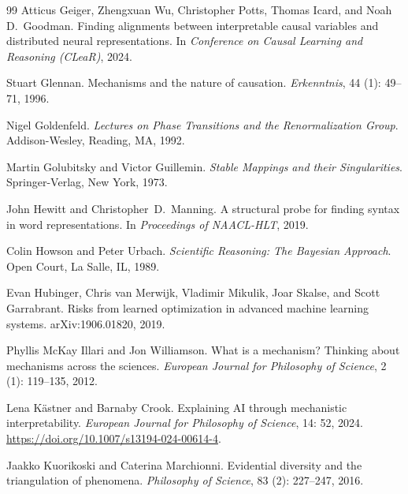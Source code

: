 \documentclass{article}
\begin{document}
\begin{thebibliography}{99}
Atticus Geiger, Zhengxuan Wu, Christopher Potts, Thomas Icard, and Noah D.\
  Goodman.
\newblock Finding alignments between interpretable causal variables and
  distributed neural representations.
\newblock In \emph{Conference on Causal Learning and Reasoning (CLeaR)}, 2024.

Stuart Glennan.
\newblock Mechanisms and the nature of causation.
\newblock \emph{Erkenntnis}, 44 (1): 49--71, 1996.

Nigel Goldenfeld.
\newblock \emph{Lectures on Phase Transitions and the Renormalization Group}.
\newblock Addison-Wesley, Reading, MA, 1992.

Martin Golubitsky and Victor Guillemin.
\newblock \emph{Stable Mappings and their Singularities}.
\newblock Springer-Verlag, New York, 1973.

John Hewitt and Christopher~D.\ Manning.
\newblock A structural probe for finding syntax in word representations.
\newblock In \emph{Proceedings of NAACL-HLT}, 2019.

Colin Howson and Peter Urbach.
\newblock \emph{Scientific Reasoning: The Bayesian Approach}.
\newblock Open Court, La Salle, IL, 1989.

Evan Hubinger, Chris van Merwijk, Vladimir Mikulik, Joar Skalse, and
  Scott Garrabrant.
\newblock Risks from learned optimization in advanced machine learning systems.
\newblock arXiv:1906.01820, 2019.

Phyllis McKay Illari and Jon Williamson.
\newblock What is a mechanism? Thinking about mechanisms across the sciences.
\newblock \emph{European Journal for Philosophy of Science},
  2 (1):\penalty0 119--135, 2012.

Lena K\"astner and Barnaby Crook.
\newblock Explaining {AI} through mechanistic interpretability.
\newblock \emph{European Journal for Philosophy of Science}, 14: 52,
  2024.
\newblock \url{https://doi.org/10.1007/s13194-024-00614-4}.

Jaakko Kuorikoski and Caterina Marchionni.
\newblock Evidential diversity and the triangulation of phenomena.
\newblock \emph{Philosophy of Science}, 83 (2):\penalty0 227--247, 2016.


\end{thebibliography}
\end{document}
